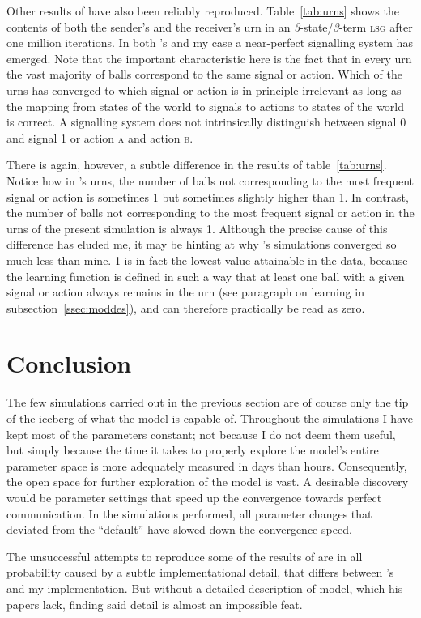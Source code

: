 \documentclass[
	DIV=calc,
	BCOR=0mm,
	pagesize,
	titlepage
]{scrartcl}
\newcommand{\lsg}{\textsc{lsg}}
\newcommand{\nslsg}[1]{\textit{#1}-state/\textit{#1}-term \lsg}
\begin{document}
Other results of \citet{barrett_numerical_2006} have also been reliably reproduced.
Table~\ref{tab:urns} shows the contents of both the sender's and the receiver's urn in an \nslsg{3} after one million iterations.
In both \citeauthor{barrett_numerical_2006}'s and my case a near-perfect signalling system has emerged.
Note that the important characteristic here is the fact that in every urn the vast majority of balls correspond to the same signal or action.
Which of the urns has converged to which signal or action is in principle irrelevant as long as the mapping from states of the world to signals to actions to states of the world is correct.
A signalling system does not intrinsically distinguish between signal 0 and signal 1 or action \textsc{a} and action \textsc{b}.

There is again, however, a subtle difference in the results of table~\ref{tab:urns}.
Notice how in \citeauthor{barrett_numerical_2006}'s urns, the number of balls not corresponding to the most frequent signal or action is sometimes 1 but sometimes slightly higher than 1.
In contrast, the number of balls not corresponding to the most frequent signal or action in the urns of the present simulation is always 1.
Although the precise cause of this difference has eluded me, it may be hinting at why \citeauthor{barrett_numerical_2006}'s simulations converged so much less than mine.
1 is in fact the lowest value attainable in the data, because the learning function is defined in such a way that at least one ball with a given signal or action always remains in the urn (see paragraph on learning in subsection~\ref{ssec:moddes}), and can therefore practically be read as zero.

\section{Conclusion}
\label{ssec:rescon}
The few simulations carried out in the previous section are of course only the tip of the iceberg of what the model is capable of.
Throughout the simulations I have kept most of the parameters constant; not because I do not deem them useful, but simply because the time it takes to properly explore the model's entire parameter space is more adequately measured in days than hours.
Consequently, the open space for further exploration of the model is vast.
A desirable discovery would be parameter settings that speed up the convergence towards perfect communication.
In the simulations performed, all parameter changes that deviated from the ``default'' have slowed down the convergence speed.

The unsuccessful attempts to reproduce some of the results of \citet{barrett_numerical_2006} are in all probability caused by a subtle implementational detail, that differs between \citeauthor{barrett_numerical_2006}'s and my implementation.
But without a detailed description of  model, which his papers lack, finding said detail is almost an impossible feat.

\newpage\twocolumn\recalctypearea
\end{document}
